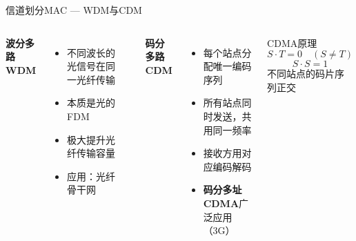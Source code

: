 \documentclass[10pt, aspectratio=169]{beamer}
\begin{document}
\begin{frame}{信道划分MAC --- WDM与CDM}
    \begin{columns}[t]
        \textbf{波分多路WDM}
        \begin{itemize}
            \item 不同波长的光信号在同一光纤传输
            \item 本质是光的FDM
            \item 极大提升光纤传输容量
            \item 应用：光纤骨干网
        \end{itemize}
        \vspace{0.5em}
        \begin{center}
        \end{center}
        \textbf{码分多路CDM}
        \begin{itemize}
            \item 每个站点分配唯一编码序列
            \item 所有站点同时发送，共用同一频率
            \item 接收方用对应编码解码
            \item \textbf{码分多址CDMA}广泛应用（3G）
        \end{itemize}
        \vspace{0.3em}
        \begin{block}{CDMA原理}
            \[
            S \cdot T = 0 \quad (S \neq T)
            \]
            \[
            S \cdot S = 1
            \]
            不同站点的码片序列正交
        \end{block}
    \end{columns}
\end{frame}
\end{document}
